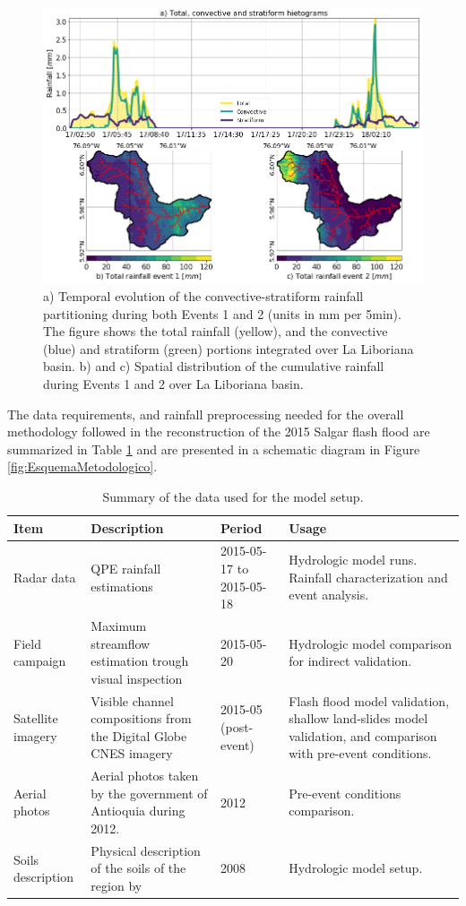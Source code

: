 \documentclass[hess, manuscript]{copernicus}
\begin{document}
\begin{figure}[t]
\centering
 \includegraphics[width=12cm]{Figures/Rainfall_separation.png}
 \caption{a) Temporal evolution of the convective-stratiform rainfall partitioning during both Events 1 and 2 (units in mm per 5min). The figure shows the total rainfall (yellow), and the convective (blue) and stratiform (green) portions integrated over La Liboriana basin. b) and c) Spatial distribution of the cumulative rainfall during Events 1 and 2 over La Liboriana basin.}
    \label{fig:separacionLluvia}
\end{figure}

The data requirements, and rainfall preprocessing needed for the overall methodology followed in the reconstruction of the 2015 Salgar flash flood are summarized in Table \ref{tab:data} and are   presented in a schematic diagram in Figure \ref{fig:EsquemaMetodologico}. \\


    \begin{table}[]
        \centering
        \begin{tabularx}{\textwidth}{p{2.5cm} p{4cm} p{2cm} p{4cm} }
    \hline 
    Item & Description & Period & Usage \\
    \hline
Radar data & QPE rainfall estimations & 2015-05-17 to 2015-05-18 & Hydrologic model runs. Rainfall characterization and event analysis. \\
Field campaign & Maximum streamflow estimation trough visual inspection & 2015-05-20 & Hydrologic model comparison for indirect validation. \\
Satellite imagery & Visible channel compositions from the Digital Globe CNES imagery & 2015-05 (post-event) & Flash flood model validation, shallow land-slides model validation, and comparison with pre-event conditions. \\
Aerial photos & Aerial photos taken by the government of Antioquia during 2012. & 2012 & Pre-event conditions comparison. \\
Soils description & Physical description of the soils of the region by \cite{Osorio2008} & 2008 & Hydrologic model setup. \\
\hline
\end{tabularx}
        \caption{Summary of the data used for the model setup.}
        \label{tab:data}
    \end{table}
\end{document}
